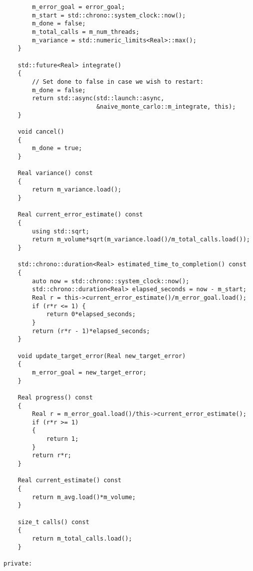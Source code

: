 \documentclass[landscape]{article}
\numberwithin{equation}{section}
\begin{document}
\begin{verbatim}
        m_error_goal = error_goal;
        m_start = std::chrono::system_clock::now();
        m_done = false;
        m_total_calls = m_num_threads;
        m_variance = std::numeric_limits<Real>::max();
    }

    std::future<Real> integrate()
    {
        // Set done to false in case we wish to restart:
        m_done = false;
        return std::async(std::launch::async,
                          &naive_monte_carlo::m_integrate, this);
    }

    void cancel()
    {
        m_done = true;
    }

    Real variance() const
    {
        return m_variance.load();
    }

    Real current_error_estimate() const
    {
        using std::sqrt;
        return m_volume*sqrt(m_variance.load()/m_total_calls.load());
    }

    std::chrono::duration<Real> estimated_time_to_completion() const
    {
        auto now = std::chrono::system_clock::now();
        std::chrono::duration<Real> elapsed_seconds = now - m_start;
        Real r = this->current_error_estimate()/m_error_goal.load();
        if (r*r <= 1) {
            return 0*elapsed_seconds;
        }
        return (r*r - 1)*elapsed_seconds;
    }

    void update_target_error(Real new_target_error)
    {
        m_error_goal = new_target_error;
    }

    Real progress() const
    {
        Real r = m_error_goal.load()/this->current_error_estimate();
        if (r*r >= 1)
        {
            return 1;
        }
        return r*r;
    }

    Real current_estimate() const
    {
        return m_avg.load()*m_volume;
    }

    size_t calls() const
    {
        return m_total_calls.load();
    }

private:


\end{verbatim}
\end{document}

